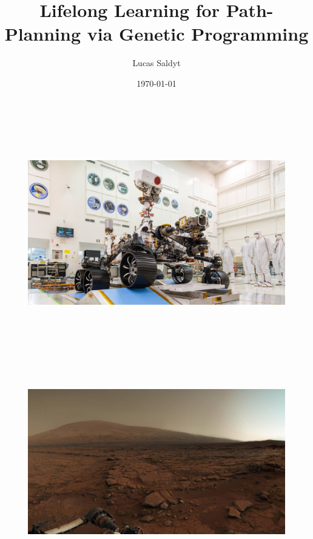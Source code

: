 \documentclass[aspectratio=169]{beamer}
\title[Learning Diverse Programs]{Lifelong Learning for Path-Planning via Genetic Programming}
\author{Lucas Saldyt}
\institute{Arizona State University}
\date{\today}
\begin{document}
\maketitle

\begin{frame}[plain]
  \begin{figure}
  \centering
  \vspace*{-1em}
  \hspace*{-3em}
  \includegraphics[height=9.5cm,keepaspectratio]{figures/perseverance.jpg}
  \end{figure}
\end{frame}

\begin{frame}[plain]
  
  \begin{figure}
  \centering
  \vspace*{-1em}
  \hspace*{-3em}
  \includegraphics[height=9.5cm,keepaspectratio]{figures/mars_surface.jpg}
  \end{figure}
\end{frame}
\end{document}
